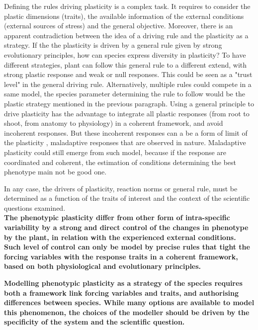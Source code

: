 Defining the rules driving plasticity is a complex task. It requires to consider the plastic dimensions (traits), the available information of the external conditions (external sources of stress) and the general objective. Moreover, there is an apparent contradiction between the idea of a driving rule and the plasticity as a strategy. If the the plasticity is driven by a general rule given by strong evolutionary principles, how can species express diversity in plasticity? To have different strategies, plant can follow this general rule to a different extend, with strong plastic response and weak or null responses. This could be seen as a "trust level" in the general driving rule. Alternatively, multiple rules could compete in a same model, the species parameter determining the rule to follow would be the plastic strategy mentioned in the previous paragraph. Using a general principle to drive plasticity has the advantage to integrate all plastic responses (from root to shoot, from anatomy to physiology) in a coherent framework, and avoid incoherent responses. But these incoherent responses can a be a form of limit of the plasticity \parencite{dewitt_costs_1998, van_kleunen_constraints_2005}, maladaptive responses that are observed in nature. Maladaptive plasticity could still emerge from such model, because if the response are coordinated and coherent, the estimation of conditions determining the best phenotype main not be good one.

In any case, the drivers of plasticity, reaction norms or general rule, must be determined as a function of the traits of interest and the context of the scientific questions examined.\\


\textbf{The phenotypic plasticity differ from other form of intra-specific variability by a strong and direct control of the changes in phenotype by the plant, in relation with the experienced external conditions. Such level of control can only be model by precise rules that tight the forcing variables with the response traits in a coherent framework, based on both physiological and evolutionary principles.}

\textbf{ Modelling phenotypic plasticity as a strategy of the species requires both a framework link forcing variables and traits, and authorising differences between species. While many options are available to model this phenomenon, the choices of the modeller should be driven by the specificity of the system and the scientific question.}
